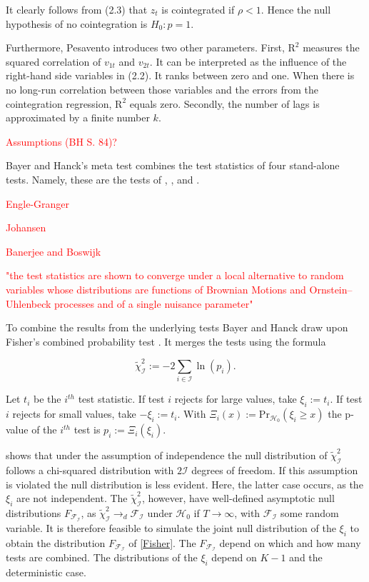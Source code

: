 \documentclass[12pt,a4paper]{article}
\begin{document}
It clearly follows from (2.3) that \(z_t\) is cointegrated if
\(\rho < 1\). Hence the null hypothesis of no cointegration is
\(H_0: p = 1\).

Furthermore, Pesavento introduces two other parameters. First,
\(\text{R}^2\) measures the squared correlation of \(v_{1t}\) and
\(v_{2t}\). It can be interpreted as the influence of the right-hand
side variables in (2.2). It ranks between zero and one. When there is no
long-run correlation between those variables and the errors from the
cointegration regression, \(\text{R}^2\) equals zero. Secondly, the
number of lags is approximated by a finite number \(k\).

\textcolor{red}{Assumptions (BH S. 84)?}

Bayer and Hanck's \autocite*{Bayerhanck_2012} meta test combines the
test statistics of four stand-alone tests. Namely, these are the tests
of \textcite{Englegranger_1987}, \textcite{Johansen_1988},
\textcite{Boswijk_1994} and \textcite{Banerjee_1998}.

\textcolor{red}{Engle-Granger}

\textcolor{red}{Johansen}

\textcolor{red}{Banerjee and Boswijk}

\textcolor{red}{"the test statistics are shown to converge under a local alternative to random variables whose distributions are functions of Brownian Motions and Ornstein–Uhlenbeck processes and of a single nuisance parameter"}

To combine the results from the underlying tests Bayer and Hanck draw
upon Fisher's combined probability test \autocite{Fisher_1932}. It
merges the tests using the formula

\begin{equation}
\tilde{\chi}^2_{\mathcal{I}} := -2 \sum_{i \in \mathcal{I}} \ln{(p_i)}. 
\label{Fisher}
\end{equation}

Let \(t_i\) be the \(i^{th}\) test statistic. If test \(i\) rejects for
large values, take \(\xi_i := t_i\). If test \(i\) rejects for small
values, take \(-\xi_i := t_i\). With
\(\Xi_i(x) := \text{Pr}_{\mathcal{H_0}}(\xi_i \geq x)\) the p-value of
the \(i^{th}\) test is \(p_i := \Xi_i(\xi_i)\).

\textcite{Fisher_1932} shows that under the assumption of independence
the null distribution of \(\tilde{\chi}^2_{\mathcal{I}}\) follows a
chi-squared distribution with \(2\mathcal{I}\) degrees of freedom. If
this assumption is violated the null distribution is less evident. Here,
the latter case occurs, as the \(\xi_i\) are not independent. The
\(\tilde{\chi}^2_{\mathcal{I}}\), however, have well-defined asymptotic
null distributions \(F_{\mathcal{F_I}}\), as
\(\tilde{\chi}^2_{\mathcal{I}} \rightarrow_d \mathcal{F_I}\) under
\(\mathcal{H_0}\) if \(T \rightarrow \infty\), with \(\mathcal{F_I}\)
some random variable. It is therefore feasible to simulate the joint
null distribution of the \(\xi_i\) to obtain the distribution
\(F_{\mathcal{F_I}}\) of \ref{Fisher}. The \(F_{\mathcal{F_I}}\) depend
on which and how many tests are combined. The distributions of the
\(\xi_i\) depend on \(K-1\) and the deterministic case.
\end{document}
